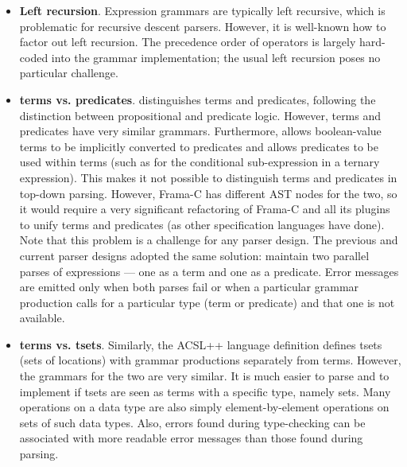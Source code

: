 \begin{itemize}
\item \textbf{Left recursion}. Expression grammars are typically left recursive, which is problematic for recursive descent parsers. 
However, it is well-known how to factor out left recursion. 
The precedence order of operators is largely hard-coded into the grammar implementation; the usual left recursion poses no particular challenge.

\item \textbf{terms vs. predicates}. \acslpp distinguishes terms and predicates, following the distinction between propositional and predicate logic. 
However, terms and predicates have very similar grammars. 
Furthermore, \acslpp allows boolean-value terms to be implicitly converted to predicates and allows predicates to be used within terms (such as for the conditional sub-expression in a ternary expression). 
This makes it not possible to distinguish terms and predicates in top-down parsing. 
However, Frama-C has different AST nodes for the two, so it would require a very significant refactoring of Frama-C and all its plugins to unify terms and predicates (as other specification languages have done). 
Note that this problem is a challenge for any parser design. 
The previous and current parser designs adopted the same solution: maintain two parallel parses of expressions --- one as a term and one as a predicate. 
Error messages are emitted only when both parses fail or when a particular grammar production calls for a particular type (term or predicate) and that one is not available.

\item \textbf{terms vs. tsets}. Similarly, the ACSL++ language definition defines tsets (sets of locations) with grammar productions separately from terms. 
However, the grammars for the two are very similar. 
It is much easier to parse and to implement if tsets are seen as terms with a specific type, namely sets. 
Many operations on a data type are also simply element-by-element operations on sets of such data types.
Also, errors found during type-checking can be associated with more readable error messages than those found during parsing.


\end{itemize}
